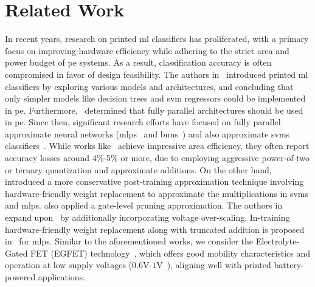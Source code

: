 \section{Related Work}
\label{sec:elated}
In recent years, research on printed \gls{ml} classifiers has proliferated, with a primary focus on improving hardware efficiency while adhering to the strict area and power budget of \gls{pe} systems.
As a result, classification accuracy is often compromised in favor of design feasibility.
The authors in~\cite{Mubarik:MICRO:2020:printedml} introduced printed \gls{ml} classifiers by exploring various models and architectures, and concluding that only simpler models like decision trees and \gls{svm} regressors could be implemented in \gls{pe}.
Furthermore,~\cite{Mubarik:MICRO:2020:printedml} determined that fully parallel architectures should be used in \gls{pe}. %
Since then, significant research efforts have focused on fully parallel approximate neural networks (\glspl{mlp}~\cite{Armeniakos:DATE2022:axml, Armeniakos:TCAD2023:cross, Armeniakos:TC2023:codesign,Afentaki:ICCAD23:hollistic,Afentaki:DATE2024:embedding} and \glspl{bnn}~\cite{Mrazek:ICCAD2024}) and also approximate \glspl{svm} classifiers~\cite{Armeniakos:DATE2022:axml, Armeniakos:TCAD2023:cross}.
While works like~\cite{Afentaki:ICCAD23:hollistic,Afentaki:DATE2024:embedding,Mrazek:ICCAD2024} achieve impressive area efficiency, they often report accuracy losses around 4\%-5\% or more, due to employing aggressive power-of-two or ternary quantization and approximate additions.
On the other hand,~\cite{Armeniakos:DATE2022:axml} introduced a more conservative post-training approximation technique involving hardware-friendly weight replacement to approximate the multiplications in \glspl{svm} and \glspl{mlp}.
\cite{Armeniakos:DATE2022:axml} also applied a gate-level pruning approximation.
The authors in~\cite{Armeniakos:TCAD2023:cross} expand upon~\cite{Armeniakos:DATE2022:axml} by additionally incorporating voltage over-scaling.
In-training hardware-friendly weight replacement along with truncated addition is proposed in~\cite{Armeniakos:TC2023:codesign} for \glspl{mlp}.
Similar to the aforementioned works, we consider the Electrolyte-Gated FET (EGFET) technology~\cite{Bleier:ISCA:2020:printedml}, which offers good mobility characteristics and operation at low supply voltages ($0.6$V-$1$V~\cite{Marques:Materials:2019}), aligning well with printed battery-powered applications. 

